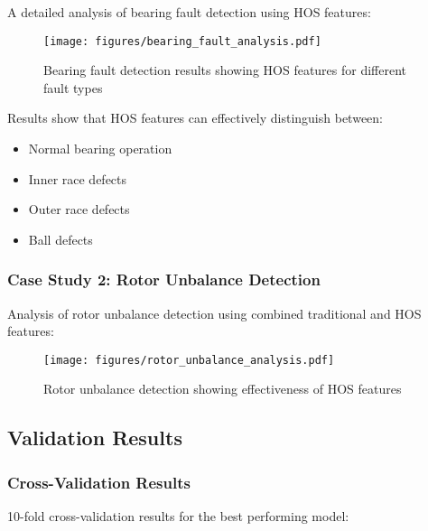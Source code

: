 A detailed analysis of bearing fault detection using HOS features:

\begin{figure}[H]
\centering
\texttt{[image: figures/bearing\_fault\_analysis.pdf]}
\caption{Bearing fault detection results showing HOS features for different fault types}
\label{fig:bearing_fault_analysis}
\end{figure}

Results show that HOS features can effectively distinguish between:
\begin{itemize}
    \item Normal bearing operation
    \item Inner race defects
    \item Outer race defects
    \item Ball defects
\end{itemize}

\subsubsection{Case Study 2: Rotor Unbalance Detection}

Analysis of rotor unbalance detection using combined traditional and HOS features:

\begin{figure}[H]
\centering
\texttt{[image: figures/rotor\_unbalance\_analysis.pdf]}
\caption{Rotor unbalance detection showing effectiveness of HOS features}
\label{fig:rotor_unbalance_analysis}
\end{figure}

\subsection{Validation Results}

\subsubsection{Cross-Validation Results}

10-fold cross-validation results for the best performing model:

